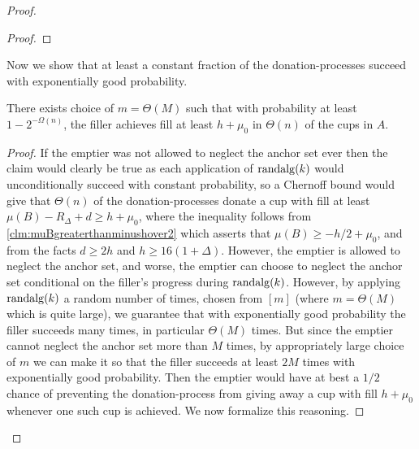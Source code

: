 \begin{proof}
\begin{proof}
\end{proof}

Now we show that at least a constant fraction of the
donation-processes succeed with exponentially good probability.
\begin{clm}
  There exists choice of $m =\Theta(M)$ such that with
  probability at least $1-2^{-\Omega(n)}$, the filler achieves
  fill at least $h+\mu_0$ in $\Theta(n)$ of the cups in $A$. 
\end{clm}
\begin{proof}
  If the emptier was not allowed to neglect the anchor set ever
  then the claim would clearly be true as each application of
  $\operatorname{\text{\textup{randalg}}}(k)$ would unconditionally succeed with constant
  probability, so a Chernoff bound would give that $\Theta(n)$ of
  the donation-processes donate a cup with fill at least $\mu(B)
  - R_\Delta + d \ge h + \mu_0$, where the inequality follows
  from \cref{clm:muBgreaterthanminushover2} which asserts that
  $\mu(B) \ge -h/2 + \mu_0$, and from the facts $d\ge 2h$ and $h
  \ge 16(1+\Delta)$. However, the emptier is allowed to neglect
  the anchor set, and worse, the emptier can choose to neglect
  the anchor set conditional on the filler's progress during
  $\operatorname{\text{\textup{randalg}}}(k)$. However, by applying $\operatorname{\text{\textup{randalg}}}(k)$ a random
  number of times, chosen from $[m]$ (where $m=\Theta(M)$ which
  is quite large), we guarantee that with exponentially good
  probability the filler succeeds many times, in particular
  $\Theta(M)$ times. But since the emptier cannot neglect the
  anchor set more than $M$ times, by appropriately large choice
  of $m$ we can make it so that the filler succeeds at least $2M$
  times with exponentially good probability. Then the emptier
  would have at best a $1/2$ chance of preventing the
  donation-process from giving away a cup with fill $h+\mu_0$
  whenever one such cup is achieved. We now formalize this
  reasoning.


\end{proof}
\end{proof}
